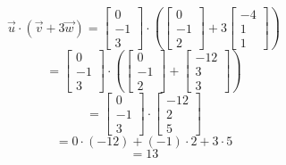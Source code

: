 \documentclass{article}
\begin{document}
\[\vec{u} \cdot (\vec{v}+3\vec{w}) = \begin{bmatrix} 0 \\ -1 \\ 3 \end{bmatrix} \cdot (\begin{bmatrix} 0 \\ -1 \\ 2 \end{bmatrix} + 3\begin{bmatrix}-4 \\ 1 \\ 1 \end{bmatrix})\]
\[ = \begin{bmatrix} 0 \\ -1 \\ 3 \end{bmatrix} \cdot (\begin{bmatrix} 0 \\ -1 \\ 2 \end{bmatrix} + \begin{bmatrix} -12 \\ 3 \\ 3 \end{bmatrix})\]
\[ = \begin{bmatrix} 0 \\ -1 \\ 3 \end{bmatrix} \cdot \begin{bmatrix} -12 \\ 2 \\ 5 \end{bmatrix}\]
\[=0\cdot(-12) + (-1) \cdot 2 + 3 \cdot 5\]
\[=13\]
\end{document}
